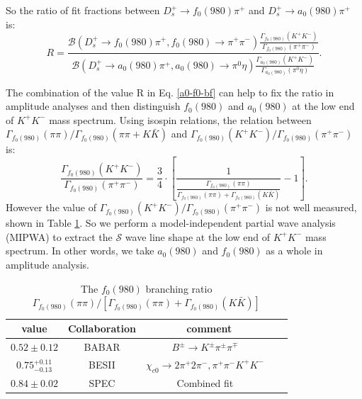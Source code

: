 {    So the ratio of fit fractions between $D_{s}^{+} \rightarrow f_{0}(980)\pi^{+}$ and $D_{s}^{+} \rightarrow a_{0}(980)\pi^{+}$ is: 
    \begin{equation}
            R  =\frac{\mathcal{B}(D_{s}^{+} \rightarrow f_{0}(980)\pi^{+}, f_{0}(980) \rightarrow \pi^{+}\pi^{-})  \frac{\Gamma_{f_{0}(980)}(K^{+}K^{-})}{ \Gamma_{f_{0}(980)}(\pi^{+}\pi^{-})}}{\mathcal{B}(D_{s}^{+} \rightarrow a_{0}(980)\pi^{+}, a_{0}(980) \rightarrow \pi^{0}\eta)  \frac{\Gamma_{a_{0}(980)}(K^{+}K^{-})}{ \Gamma_{a_{0}(980)}(\pi^{0}\eta)}}. \label{a0-f0-bf}
    \end{equation}
    
    The combination of the value R in Eq. \ref{a0-f0-bf} can help to fix the ratio in amplitude analyses and then distinguish $f_{0}(980)$ and $a_{0}(980)$ at the low end of $K^{+}K^{-}$ mass spectrum.
    Using isospin relations,  the relation between $\Gamma_{f_{0}(980)}(\pi\pi) /  \Gamma_{f_{0}(980)}(\pi\pi+K\bar{K})$ and $\Gamma_{f_{0}(980)}(K^{+}K^{-}) / \Gamma_{f_{0}(980)}(\pi^{+}\pi^{-})$ is:
    \begin{equation}
        \frac{\Gamma_{f_{0}(980)}(K^{+}K^{-})}{ \Gamma_{f_{0}(980)}(\pi^{+}\pi^{-})} =  \frac{3}{4} \cdot \left[\frac{1}{\frac{\Gamma_{f_{0}(980)}(\pi\pi)} {\Gamma_{f_{0}(980)}(\pi\pi)+\Gamma_{f_{0}(980)}(K\bar{K})}} -1\right]. \label{f0-KK-pipi-relation}
    \end{equation}
    However the value of $\Gamma_{f_{0}(980)}(K^{+}K^{-}) / \Gamma_{f_{0}(980)}(\pi^{+}\pi^{-})$ is not well measured, shown in Table \ref{f0-KK-pipi}. %
    So we perform a model-independent partial wave analysis (MIPWA) to extract the $\mathcal{S}$ wave line shape at the low end of $K^{+}K^{-}$ mass spectrum. %
    In other words, we take $a_{0}(980)$ and $f_{0}(980)$ as a whole in amplitude analysis.

\begin{table}[htbp]
    \caption{The $f_{0}(980)$ branching ratio $\Gamma_{f_{0}(980)}(\pi\pi) / \left[ \Gamma_{f_{0}(980)}(\pi\pi)+\Gamma_{f_{0}(980)}(K\bar{K})\right]$}
    \label{f0-KK-pipi}
    \begin{center}
        \begin{tabular}{cccc}
            \toprule
            value &         Collaboration & comment\\
            \hline
            $0.52\pm0.12$ &             BABAR    & $B^{\pm} \rightarrow K^{\pm}\pi^{\pm}\pi^{\mp}$   ~\cite{pipi-KK-1} \\
            $0.75_{-0.13}^{+0.11}$ &    BESII    & $\chi_{c0} \rightarrow 2\pi^{+}2\pi^{-}, \pi^{+}\pi^{-}K^{+}K^{-}$   ~\cite{pipi-KK-2} \\
            $0.84\pm0.02$ &             SPEC    & Combined fit   ~\cite{pipi-KK-3} \\
            \bottomrule
        \end{tabular}
    \end{center}
\end{table}





}

